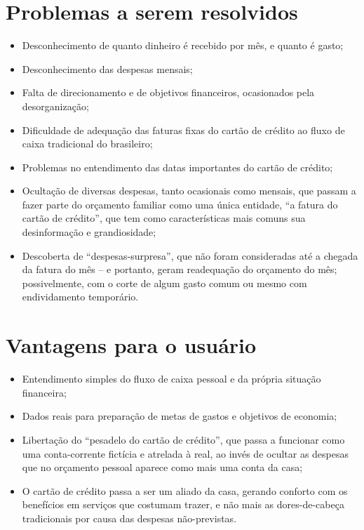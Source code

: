 \documentclass[a4paper]{abnt}
\begin{document}
\section{Problemas a serem resolvidos}

\begin{itemize}
	\item Desconhecimento de quanto dinheiro é recebido por mês, e quanto é gasto;
	\item Desconhecimento das despesas mensais;
	\item Falta de direcionamento e de objetivos financeiros, ocasionados pela desorganização;
	\item Dificuldade de adequação das faturas fixas do cartão de crédito ao fluxo de caixa tradicional do brasileiro;
	\item Problemas no entendimento das datas importantes do cartão de crédito;
	\item Ocultação de diversas despesas, tanto ocasionais como mensais, que passam a fazer parte do orçamento familiar como uma única entidade, ``a fatura do cartão de crédito'', que tem como características mais comuns sua desinformação e grandiosidade;
	\item Descoberta de ``despesas-surpresa'', que não foram consideradas até a chegada da fatura do mês -- e portanto, geram readequação do orçamento do mês; possivelmente, com o corte de algum gasto comum ou mesmo com endividamento temporário.
\end{itemize}

\section{Vantagens para o usuário}

\begin{itemize}
	\item Entendimento simples do fluxo de caixa pessoal e da própria situação financeira;
	\item Dados reais para preparação de metas de gastos e objetivos de economia;
	\item Libertação do ``pesadelo do cartão de crédito'', que passa a funcionar como uma conta-corrente fictícia e atrelada à real, ao invés de ocultar as despesas que no orçamento pessoal aparece como mais uma conta da casa;
	\item O cartão de crédito passa a ser um aliado da casa, gerando conforto com os benefícios em serviços que costumam trazer, e não mais as dores-de-cabeça tradicionais por causa das despesas não-previstas.
\end{itemize}
\end{document}
